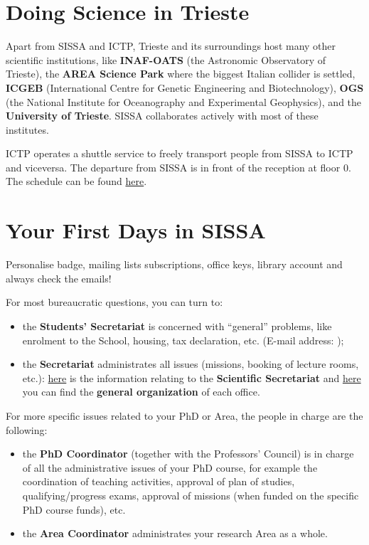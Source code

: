 \documentclass{sissavademecum}
\begin{document}
\section{Doing Science in Trieste}

Apart from SISSA and ICTP, Trieste and its surroundings host many other scientific institutions, like \textbf{INAF-OATS }(the Astronomic Observatory of Trieste), the \textbf{AREA Science Park} where the biggest Italian collider is settled, \textbf{ICGEB }(International Centre for Genetic Engineering and Biotechnology), \textbf{OGS }(the National Institute for Oceanography and Experimental Geophysics), and the \textbf{University of Trieste}. SISSA collaborates actively with most of these institutes. 

ICTP operates a shuttle service to freely transport people from SISSA to ICTP and viceversa. The departure from SISSA is in front of the reception at floor $0$. The schedule can be found  \href{https://www.ictp.it/visit-ictp/transportation/campus-shuttle-services.aspx#close}{here}. 


\section{Your First Days in SISSA}

Personalise badge, mailing lists subscriptions, office keys, library account and always check the emails!

\noindent For most bureaucratic questions, you can turn to:
\begin{itemize}
	\item the \textbf{Students' Secretariat} is concerned with ``general'' problems, like enrolment to the School, housing, tax declaration, etc. (E-mail address: );
	\item the \textbf{Secretariat} administrates all issues (missions, booking of lecture rooms, etc.): \href{https://www.sissa.it/scientific-secretariat}{here} is the information relating to the \textbf{Scientific Secretariat} and \href{https://www.sissa.it/articolazione-degli-uffici}{here} you can find the \textbf{general organization} of each office.
\end{itemize}
For more specific issues related to your PhD or Area, the people in charge are the following:
\begin{itemize}
	\item the \textbf{PhD Coordinator} (together with the Professors' Council) is in charge of all the administrative issues of your PhD course, for example the coordination of teaching activities, approval of plan of studies, qualifying/progress exams, approval of missions (when funded on the specific PhD course funds), etc.
    \item the \textbf{Area Coordinator} administrates your research Area as a whole.
\end{itemize}
\end{document}
